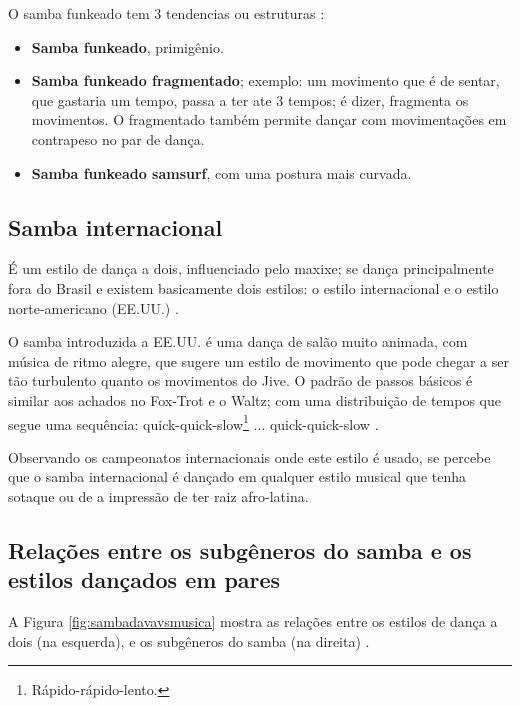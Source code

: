 O samba funkeado tem 3 tendencias ou estruturas  \cite{sambafunkeadoJimmyDeOliveiraPart2}:
\begin{itemize}
\item \textbf{Samba funkeado}, primigênio.
\item \textbf{Samba funkeado fragmentado}; exemplo: um movimento que é de sentar, que gastaria um tempo, 
passa a ter ate 3 tempos; é dizer, fragmenta os movimentos. 
O fragmentado também permite dançar com movimentações em contrapeso no par de dança.
\item \textbf{Samba funkeado samsurf}, com uma postura mais curvada.
\end{itemize}

 
\subsection{Samba internacional}
\label{subsec:DancaSambaInternacional} 
É um estilo de dança a dois, influenciado pelo maxixe;
se dança principalmente fora do Brasil e existem basicamente dois estilos: 
o estilo internacional e o estilo norte-americano (EE.UU.) \cite[pp. 134-135]{perna2002samba}.

O samba introduzida a EE.UU. é uma dança de salão muito animada, 
com música de ritmo alegre, que sugere um estilo de movimento que pode
chegar a ser tão turbulento quanto os movimentos do Jive.
O padrão de passos básicos é similar aos achados no Fox-Trot e o Waltz;
com uma distribuição de tempos que segue uma sequência: 
quick-quick-slow\footnote{Rápido-rápido-lento.} ... quick-quick-slow \cite{parson2016ballroom}.

Observando os campeonatos internacionais onde este estilo é usado, 
se percebe que o samba internacional é dançado em qualquer estilo musical que
tenha sotaque ou de a impressão de ter raiz afro-latina.

\subsection{Relações entre os subgêneros do samba e os estilos dançados em pares}

A Figura \ref{fig:sambadavavsmusica} mostra as relações entre os estilos de dança a dois (na esquerda),
 e os subgêneros do samba (na direita) \cite[pp. 134-138]{perna2002samba}.

